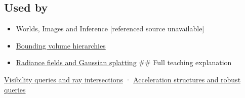 \subsection{Used by}\label{appendix-47ac1bd6d144-used-by}

\begin{itemize}
\item
  {Worlds, Images and Inference {[}referenced source unavailable{]}}
\item
  \hyperref[appendix-0b426c47dd78]{Bounding volume hierarchies}
\item
  \hyperref[appendix-c5b332e400e7]{Radiance fields and Gaussian splatting} \#\# Full teaching explanation
\end{itemize}

\hyperref[04-visual-computing-ii-ch028-visibility-queries-and-ray-intersections-1]{Visibility queries and ray intersections} · \hyperref[04-visual-computing-ii-ch029-acceleration-structures-and-robust-queries-1]{Acceleration structures and robust queries}
